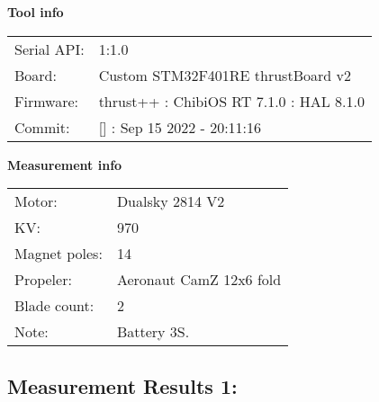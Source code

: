 \documentclass[10pt]{article}
\begin{document}
\noindent
{\large \bf Tool info}
\vspace{3mm}

\noindent
\begin{tabular}{ll}
Serial API:  & 1:1.0\\ 
Board:       & Custom STM32F401RE thrustBoard v2\\ 
Firmware:    & thrust++ : ChibiOS RT 7.1.0 : HAL 8.1.0\\ 
Commit:      & [] : Sep 15 2022 - 20:11:16
\end{tabular}
\vspace{3mm}

\noindent
{\large \bf Measurement info}
\vspace{3mm}

\noindent
\begin{tabular}{ll}
Motor:        & Dualsky 2814 V2\\ 
KV:           & 970\\ 
Magnet poles: & 14\\ 
Propeler:     & Aeronaut CamZ 12x6 fold\\ 
Blade count:  & 2\\ 
Note:         & Battery 3S.
\end{tabular}

\vspace{3mm}


\subsection*{\large \bf Measurement Results 1:}
\end{document}
